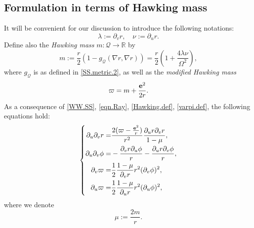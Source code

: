 \documentclass[10pt, reqno]{amsart}
\theoremstyle{definition}
\theoremstyle{remark}
\numberwithin{equation}{section}
\newcommand{\rd}{\partial}
\newcommand{\0}{\emptyset}
\newcommand{\Omg}{\Omega}
\newcommand{\bfe}{{\bf e}}
\newcommand{\f}{\frac}
\newcommand{\e}{\bfe}							%
\begin{document}
\subsection{Formulation in terms of Hawking mass}
It will be convenient for our discussion to introduce the following notations:
\begin{equation}\label{lambda.nu}
\lambda:=\rd_v r,\quad \nu:=\rd_u r.
\end{equation}
Define also the \emph{Hawking mass} $m:\mathcal Q\to \mathbb R$ by
\begin{equation}\label{Hawking.def}
m:=\f r2\left(1-g_{\mathcal Q}(\nabla r,\nabla r)\right)=\f r 2\left(1+\f{4\lambda\nu}{\Omg^2}\right),
\end{equation}
where $g_{\mathcal Q}$ is as defined in \eqref{SS.metric.2}, as well as the \emph{modified Hawking mass}
\begin{equation}\label{varpi.def}
\varpi = m + \frac{\e^{2}}{2 r}.
\end{equation}
As a consequence of \eqref{WW.SS}, \eqref{eqn.Ray}, \eqref{Hawking.def}, \eqref{varpi.def}, the following equations hold:
\begin{equation} \label{eq:EMSF-r-phi-m}
\left\{
\begin{aligned}
\rd_{u} \rd_{v} r = & \frac{2(\varpi - \frac{\e^{2}}{r})}{r^{2}} \frac{\rd_{u} r \rd_{v} r}{1-\mu}, \\
\rd_{u} \rd_{v} \phi = & - \frac{\rd_{v} r \rd_{u} \phi}{r} - \frac{\rd_{u} r \rd_{v} \phi}{r}, \\
	\rd_{v} \varpi =& \frac{1}{2} \frac{1-\mu}{\rd_{v} r} r^{2} (\rd_{v} \phi)^{2}, \\
	\rd_{u} \varpi =& \frac{1}{2} \frac{1-\mu}{\rd_{u} r} r^{2} (\rd_{u} \phi)^{2},
\end{aligned}
\right.
\end{equation}
where we denote
\begin{equation}\label{mu.def}
\mu:= \f{2m}{r}.
\end{equation}
\end{document}
